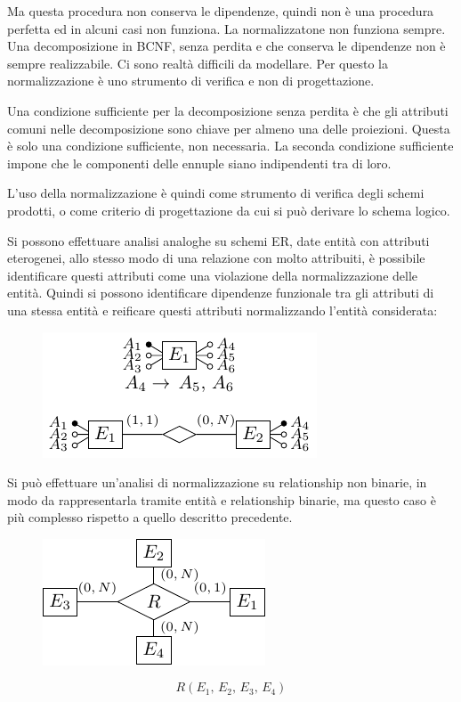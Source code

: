 \documentclass{article}
\numberwithin{equation}{subsection}
\begin{document}
Ma questa procedura non conserva le dipendenze, quindi non è una procedura perfetta ed in alcuni casi non funziona. La normalizzatone non funziona sempre. Una 
decomposizione in BCNF, senza perdita e che conserva le dipendenze non è sempre realizzabile. Ci sono realtà difficili da modellare. Per questo la normalizzazione è 
uno strumento di verifica e non di progettazione. 

Una condizione sufficiente per la decomposizione senza perdita è che gli attributi comuni nelle decomposizione sono chiave per almeno una delle proiezioni. Questa è 
solo una condizione sufficiente, non necessaria. La seconda condizione sufficiente impone che le componenti 
delle ennuple siano indipendenti tra di loro. 

L'uso della normalizzazione è quindi come strumento di verifica degli schemi prodotti, o come criterio di progettazione da cui si può derivare lo schema logico. 


Si possono effettuare analisi analoghe su schemi ER, date entità con attributi eterogenei, allo stesso modo di una relazione con molto attribuiti, è possibile 
identificare questi attributi come una violazione della normalizzazione delle entità. 
Quindi si possono identificare dipendenze funzionale tra gli attributi di una stessa entità e reificare questi attributi normalizzando l'entità considerata:

\begin{figure}[H]%
    \centering%
    \includegraphics[scale=1.2]{normalizzazione_attributi.pdf}%
\end{figure}

Si può effettuare un'analisi di normalizzazione su relationship non binarie, in modo da rappresentarla tramite entità e relationship binarie, ma questo caso è 
più complesso rispetto a quello descritto precedente. 

\begin{figure}[H]%
    \centering%
    \includegraphics[scale=1.2]{relationship_quaternaria.pdf}%
\end{figure}
\begin{equation*}
    R(E_1,\,E_2,\,E_3,\,E_4)%
\end{equation*}
\end{document}
